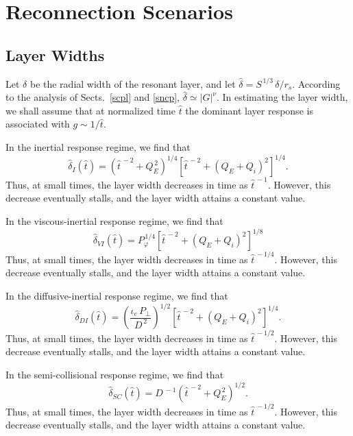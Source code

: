 \documentclass[titlepage=false,12pt]{article}
\begin{document}
\section{Reconnection Scenarios}
\subsection{Layer Widths}\label{layer}
Let $\delta$ be the radial width of the resonant layer, and let $\hat{\delta}=S^{\,1/3}\,\delta/r_s$. 
According to the analysis of Sects.~\ref{scpl} and \ref{sncp}, $\hat{\delta} \simeq |G|^\nu$. In estimating the
layer width, we shall assume that at normalized time $\hat{t}$ the dominant layer response is associated with $g\sim 1/\hat{t}$. 

In the inertial response regime, we find that
\begin{equation}\label{deltaI}
\hat{\delta}_I(\hat{t})= \left(\hat{t}^{\,-2}+Q_E^{\,2}\right)^{1/4}\left[\hat{t}^{\,-2}+ (Q_E+Q_i)^2\right]^{1/4}. 
\end{equation}
Thus, at small times, the layer width decreases in time as $\hat{t}^{\,-1}$. However, this decrease eventually stalls, and the
layer width attains a constant value. 

In the viscous-inertial response regime, we find that 
\begin{equation}\label{deltaVI}
\hat{\delta}_{VI}(\hat{t}) =P_\varphi^{\,1/4}\left[\hat{t}^{\,-2}+(Q_E+Q_i)^2\right]^{1/8}
\end{equation}
Thus, at small times, the layer width decreases in time as $\hat{t}^{\,-1/4}$. However, this decrease eventually stalls, and the
layer width attains a constant value. 

In the diffusive-inertial response regime, we find that
\begin{equation}\label{deltaDI}
\hat{\delta}_{DI}(\hat{t}) =\left(\frac{\iota_e\,P_\perp}{D^{\,2}}\right)^{1/2}\left[\hat{t}^{\,-2}+(Q_E+Q_i)^2\right]^{1/4}.
\end{equation}
Thus, at small times, the layer width decreases in time as $\hat{t}^{\,-1/2}$. However, this decrease eventually stalls, and the
layer width attains a constant value. 

In the semi-collisional response regime, we find that
\begin{equation}\label{deltaSC}
\hat{\delta}_{SC}(\hat{t}) = D^{\,-1}\left(\hat{t}^{\,-2}+Q_E^{\,2}\right)^{1/2}.
\end{equation}
Thus, at small times, the layer width decreases in time as $\hat{t}^{\,-1/2}$. However, this decrease eventually stalls, and the
layer width attains a constant value. 
\end{document}
